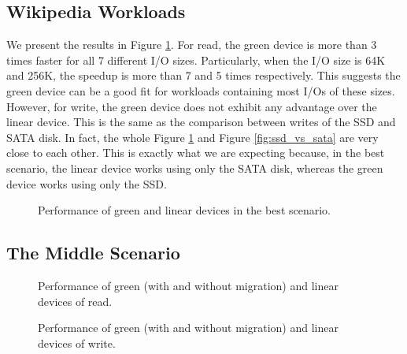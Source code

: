 \subsection{Wikipedia Workloads}

We present the results in Figure \ref{fig:best}.  For read, the green
device is more than 3 times faster for all 7 different I/O sizes.
Particularly, when the I/O size is 64K and 256K, the speedup is more
than 7 and 5 times respectively. This suggests the green device can be
a good fit for workloads containing most I/Os of these sizes. However,
for write, the green device does not exhibit any advantage over the
linear device. This is the same as the comparison between writes of
the SSD and SATA disk. In fact, the whole Figure \ref{fig:best} and
Figure \ref{fig:ssd_vs_sata} are very close to each other. This is
exactly what we are expecting because, in the best scenario, the
linear device works using only the SATA disk, whereas the green device
works using only the SSD.

\begin{figure}[t]
\begin{centering}
\caption{Performance of green and linear devices in the best
scenario.}
\label{fig:best}
\end{centering}
\end{figure}

\subsection{The Middle Scenario}

\begin{figure}[t]
\begin{centering}
\caption{Performance of green (with and without migration) and linear
devices of read.}
\label{fig:evenread}
\end{centering}
\end{figure}

\begin{figure}[t]
\begin{centering}
\caption{Performance of green (with and without migration) and linear
devices of write.}
\label{fig:evenwrite}
\end{centering}
\end{figure}

